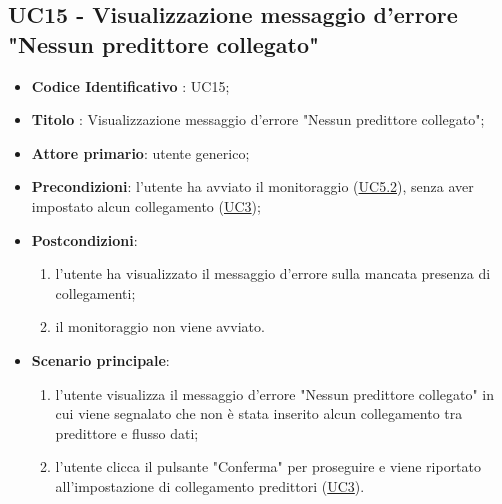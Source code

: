 	\subsection{UC15 - Visualizzazione messaggio d'errore "Nessun predittore collegato"}
		\begin{itemize}
			\item\textbf{Codice Identificativo} : UC15;
			\item\textbf{Titolo} : Visualizzazione messaggio d'errore "Nessun predittore collegato";
			\item\textbf{Attore primario}: utente generico;
			\item\textbf{Precondizioni}: l'utente ha avviato il monitoraggio (\hyperref[par:UC5.2]{UC5.2}), senza aver impostato alcun collegamento (\hyperref[par:UC3]{UC3});
			\item\textbf{Postcondizioni}:
				\begin{enumerate}
					\item l'utente ha visualizzato il messaggio d'errore sulla mancata presenza di collegamenti;	
					\item	il monitoraggio non viene avviato.
				\end{enumerate}
			\item\textbf{Scenario principale}:
				\begin{enumerate}
					\item l'utente visualizza il messaggio d'errore "Nessun predittore collegato" in cui viene segnalato che non è stata inserito alcun collegamento tra predittore e flusso dati;
					\item l'utente clicca il pulsante "Conferma" per proseguire e viene riportato all'impostazione di collegamento predittori (\hyperref[par:UC3]{UC3}).		
				\end{enumerate}		
		\end{itemize}


	








